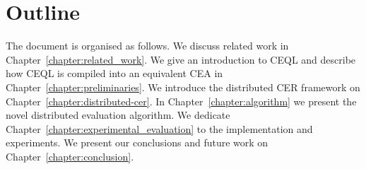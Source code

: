 \section{Outline}
\label{sec:outline}

The document is organised as follows. We discuss related work in Chapter~\ref{chapter:related_work}. We give an introduction to CEQL and describe how CEQL is compiled into an equivalent CEA in Chapter~\ref{chapter:preliminaries}. We introduce the distributed CER framework on Chapter~\ref{chapter:distributed-cer}. In Chapter~\ref{chapter:algorithm} we present the novel distributed evaluation algorithm. We dedicate Chapter~\ref{chapter:experimental_evaluation} to the implementation and experiments. We present our conclusions and future work on Chapter~\ref{chapter:conclusion}.
